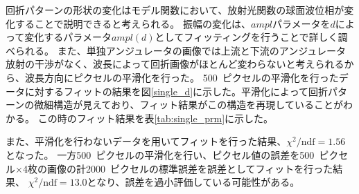 \documentclass[a4paper,11pt,uplatex]{jsbook}
\begin{document}
回折パターンの形状の変化はモデル関数において、放射光関数の球面波位相が変化することで説明できると考えられる。
振幅の変化は、$ampl$パラメータを$d$によって変化するパラメータ$ampl(d)$としてフィッティングを行うことで詳しく調べられる。
また、単独アンジュレータの画像では上流と下流のアンジュレータ放射の干渉がなく、波長によって回折画像がほとんど変わらないと考えられるから、波長方向にピクセルの平滑化を行った。
500~ピクセルの平滑化を行ったデータに対するフィットの結果を図\ref{single_d}に示した。平滑化によって回折パターンの微細構造が見えており、フィット結果がこの構造を再現していることがわかる。
この時のフィット結果を表\ref{tab:single_prm}に示した。

また、平滑化を行わないデータを用いてフィットを行った結果、$\chi^2/\text{ndf} = 1.56$となった。
一方500~ピクセルの平滑化を行い、ピクセル値の誤差を500~ピクセル$\times$4枚の画像の計2000~ピクセルの標準誤差を誤差としてフィットを行った結果、
$\chi^2/\text{ndf} = 13.0$となり、誤差を過小評価している可能性がある。
\end{document}
